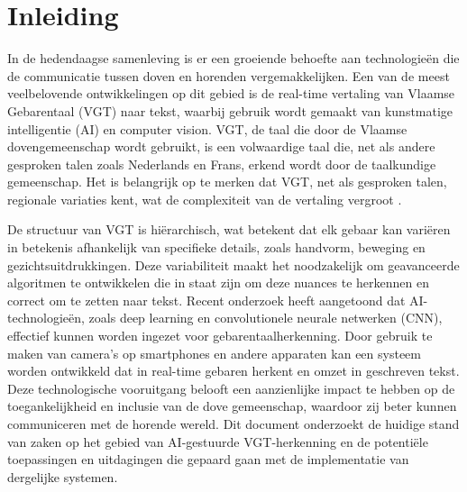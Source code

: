 


% 
\newcommand{\figref}[1]{(Zie \hyperref[#1]{figuur: \ref{#1}})}

\section{Inleiding}%
\label{sec:inleiding}

In de hedendaagse samenleving is er een groeiende behoefte aan technologieën die de communicatie tussen doven en horenden vergemakkelijken. Een van de meest veelbelovende ontwikkelingen op dit gebied is de real-time vertaling van Vlaamse Gebarentaal (VGT) naar tekst, waarbij gebruik wordt gemaakt van kunstmatige intelligentie (AI) en computer vision. VGT, de taal die door de Vlaamse dovengemeenschap wordt gebruikt, is een volwaardige taal die, net als andere gesproken talen zoals Nederlands en Frans, erkend wordt door de taalkundige gemeenschap. Het is belangrijk op te merken dat VGT, net als gesproken talen, regionale variaties kent, wat de complexiteit van de vertaling vergroot \autocite{vanmeerbergen2000simultane}.

De structuur van VGT is hiërarchisch, wat betekent dat elk gebaar kan variëren in betekenis afhankelijk van specifieke details, zoals handvorm, beweging en gezichtsuitdrukkingen. \autocite{469340}
Deze variabiliteit maakt het noodzakelijk om geavanceerde algoritmen te ontwikkelen die in staat zijn om deze nuances te herkennen en correct om te zetten naar tekst. 
Recent onderzoek heeft aangetoond dat AI-technologieën, zoals deep learning en convolutionele neurale netwerken (CNN), effectief kunnen worden ingezet voor gebarentaalherkenning.\autocite{10.52756/ijerr.2023.v34spl.004}\autocite{10.17485/ijst/v16i45.2583}
Door gebruik te maken van camera's op smartphones en andere apparaten kan een systeem worden ontwikkeld dat in real-time gebaren herkent en omzet in geschreven tekst.
Deze technologische vooruitgang belooft een aanzienlijke impact te hebben op de toegankelijkheid en inclusie van de dove gemeenschap, waardoor zij beter kunnen communiceren met de horende wereld. Dit document onderzoekt de huidige stand van zaken op het gebied van AI-gestuurde VGT-herkenning en de potentiële toepassingen en uitdagingen die gepaard gaan met de implementatie van dergelijke systemen.

